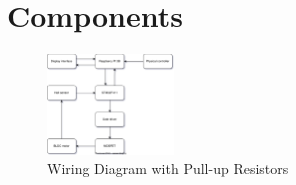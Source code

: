 \section{Components}
\begin{figure}[H]
    \centering
    \includegraphics[width=0.3\textwidth]{img/DrawIO/Componentdiagram.svg}
    \caption{Wiring Diagram with Pull-up Resistors}
    \label{fig:hall_sensor_wiring_diagram}
\end{figure}